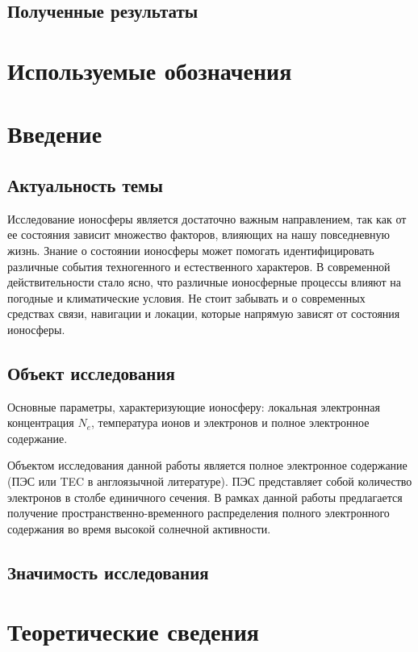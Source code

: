 \documentclass[14pt]{article}
\begin{document}
\subsection*{Полученные результаты}

\newpage
\tableofcontents

\newpage
\section*{Используемые обозначения}

\newpage
\section*{Введение}
\subsection*{Актуальность темы}
Исследование ионосферы является достаточно важным направлением, так как от ее состояния зависит множество факторов, влияющих на нашу повседневную жизнь. Знание о состоянии ионосферы может помогать идентифицировать различные события техногенного и естественного характеров. В современной действительности стало ясно, что различные ионосферные процессы влияют на погодные и климатические условия. Не стоит забывать и о современных средствах связи, навигации и локации, которые напрямую зависят от состояния ионосферы.

\subsection*{Объект исследования}
Основные параметры, характеризующие ионосферу: локальная электронная концентрация $N_e$, температура ионов и электронов и полное электронное содержание.

Объектом исследования данной работы является полное электронное содержание (ПЭС или TEC в англоязычной литературе). ПЭС представляет собой количество электронов в столбе единичного сечения. В рамках данной работы предлагается получение пространственно-временного распределения полного электронного содержания во время высокой солнечной активности.

\subsection*{Значимость исследования}


\newpage
\section{Теоретические сведения}
\end{document}
